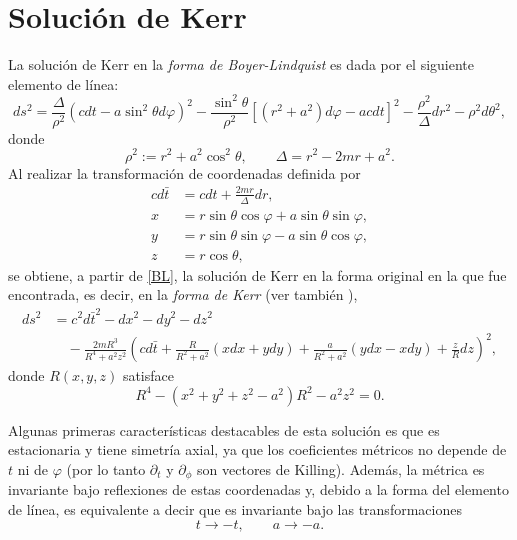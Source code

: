 \section{Solución de Kerr}
La solución de Kerr en la \textit{forma de Boyer-Lindquist} es dada por el siguiente elemento de línea:
 \begin{equation}
ds^2=\frac{\Delta}{\rho^2}(cdt-a\sin^2\theta d\varphi)^2-\frac{\sin^2\theta}{\rho^2}\left[(r^2+a^2)d\varphi-acdt \right]^2-\frac{\rho^2}{\Delta}dr^2-\rho^2d\theta^2, \label{BL}
 \end{equation}
donde
\begin{equation}
\rho^2:=r^2+a^2\cos^2\theta,\qquad \Delta=r^2-2mr+a^2.
\end{equation}
Al realizar la transformación de coordenadas definida por
\begin{equation}
\begin{aligned}
cd\bar{t}&=cdt+\frac{2mr}{\Delta}dr,\\
x&=r\sin\theta\cos\varphi+a\sin\theta\sin\varphi, \\
y&=r\sin\theta\sin\varphi-a\sin\theta\cos\varphi, \\
z&=r\cos\theta,   \label{zrt}
\end{aligned}
\end{equation}
se obtiene, a partir de \eqref{BL}, la solución de Kerr en la forma original en la que fue encontrada, es decir, en la \textit{forma de Kerr} \cite{Kerr63} (ver también \cite{Kerr65}),
\begin{align}
ds^2 &= c^2d\bar{t}^2-dx^2-dy^2-dz^2 \nonumber \\
&\quad -\frac{2mR^3}{R^4+a^2z^2}\left(cd\bar{t}+\frac{R}{R^2+a^2}(xdx+ydy)+\frac{a}{R^2+a^2}(ydx-xdy)+\frac{z}{R}dz \right)^2 , \label{Kerr}
\end{align}
donde $R(x,y,z)$ satisface
\begin{equation}
R^4 - (x^2+y^2+z^2-a^2)R^2 -a^2z^2=0.
\end{equation}

Algunas primeras características destacables de esta solución es que es estacionaria y tiene simetría axial, ya que los coeficientes métricos no depende de $t$ ni de $\varphi$ (por lo tanto $\partial_t$ y $\partial_\phi$ son vectores de Killing). Además, la métrica es invariante bajo reflexiones de estas coordenadas y, debido a la forma del elemento de línea, es equivalente a decir que es invariante bajo las transformaciones
\begin{equation}
t\rightarrow -t, \qquad a\rightarrow -a.
\end{equation}

